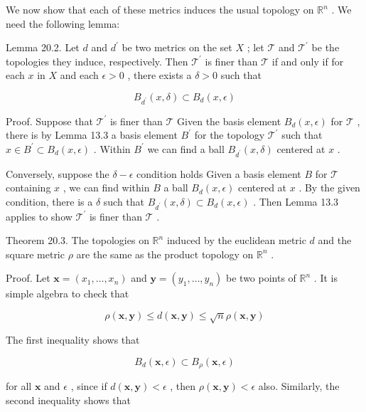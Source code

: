 \documentclass[10pt]{article}
\begin{document}
We now show that each of these metrics induces the usual topology on \({\mathbb{R}}^{n}\) . We need the following lemma:

Lemma 20.2. Let \(d\) and \({d}^{\prime }\) be two metrics on the set \(X\) ; let \(\mathcal{T}\) and \({\mathcal{T}}^{\prime }\) be the topologies they induce, respectively. Then \({\mathcal{T}}^{\prime }\) is finer than \(\mathcal{T}\) if and only if for each \(x\) in \(X\) and each \(\epsilon  > 0\) , there exists a \(\delta  > 0\) such that

\[
{B}_{{d}^{\prime }}\left( {x,\delta }\right)  \subset  {B}_{d}\left( {x,\epsilon }\right)
\]

Proof. Suppose that \({\mathcal{T}}^{\prime }\) is finer than \(\mathcal{T}\) Given the basis element \({B}_{d}\left( {x,\epsilon }\right)\) for \(\mathcal{T}\) , there is by Lemma 13.3 a basis element \({B}^{\prime }\) for the topology \({\mathcal{T}}^{\prime }\) such that \(x \in  {B}^{\prime } \subset  {B}_{d}\left( {x,\epsilon }\right)\) . Within \({B}^{\prime }\) we can find a ball \({B}_{{d}^{\prime }}\left( {x,\delta }\right)\) centered at \(x\) .

Conversely, suppose the \(\delta  - \epsilon\) condition holds Given a basis element \(B\) for \(\mathcal{T}\) containing \(x\) , we can find within \(B\) a ball \({B}_{d}\left( {x,\epsilon }\right)\) centered at \(x\) . By the given condition, there is a \(\delta\) such that \({B}_{{d}^{\prime }}\left( {x,\delta }\right)  \subset  {B}_{d}\left( {x,\epsilon }\right)\) . Then Lemma 13.3 applies to show \({\mathcal{T}}^{\prime }\) is finer than \(\mathcal{T}\) .

Theorem 20.3. The topologies on \({\mathbb{R}}^{n}\) induced by the euclidean metric \(d\) and the square metric \(\rho\) are the same as the product topology on \({\mathbb{R}}^{n}\) .

Proof. Let \(\mathbf{x} = \left( {{x}_{1},\ldots ,{x}_{n}}\right)\) and \(\mathbf{y} = \left( {{y}_{1},\ldots ,{y}_{n}}\right)\) be two points of \({\mathbb{R}}^{n}\) . It is simple algebra to check that

\[
\rho \left( {\mathbf{x},\mathbf{y}}\right)  \leq  d\left( {\mathbf{x},\mathbf{y}}\right)  \leq  \sqrt{n}\rho \left( {\mathbf{x},\mathbf{y}}\right)
\]

The first inequality shows that

\[
{B}_{d}\left( {\mathbf{x},\epsilon }\right)  \subset  {B}_{\rho }\left( {\mathbf{x},\epsilon }\right)
\]

for all \(\mathbf{x}\) and \(\epsilon\) , since if \(d\left( {\mathbf{x},\mathbf{y}}\right)  < \epsilon\) , then \(\rho \left( {\mathbf{x},\mathbf{y}}\right)  < \epsilon\) also. Similarly, the second inequality shows that
\end{document}
